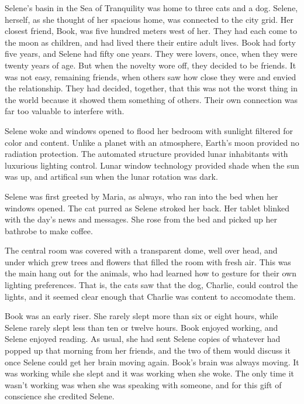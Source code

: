 

﻿Selene’s basin in the Sea of Tranquility was home to three cats and a
dog.  Selene, herself, as she thought of her spacious home, was
connected to the city grid.  Her closest friend, Book, was five
hundred meters west of her.  They had each come to the moon as
children, and had lived there their entire adult lives.  Book had
forty five years, and Selene had fifty one years.  They were lovers,
once, when they were twenty years of age.  But when the novelty wore
off, they decided to be friends.  It was not easy, remaining friends,
when others saw how close they were and envied the relationship.  They
had decided, together, that this was not the worst thing in the world
because it showed them something of others.  Their own connection was
far too valuable to interfere with.

Selene woke and windows opened to flood her bedroom with sunlight
filtered for color and content.  Unlike a planet with an atmosphere,
Earth’s moon provided no radiation protection.  The automated
structure provided lunar inhabitants with luxurious lighting control.
Lunar window technology provided shade when the sun was up, and
artifical sun when the lunar rotation was dark.

Selene was first greeted by Maria, as always, who ran into the bed
when her windows opened.  The cat purred as Selene stroked her back.
Her tablet blinked with the day’s news and messages.  She rose from
the bed and picked up her bathrobe to make coffee.

The central room was covered with a transparent dome, well over head,
and under which grew trees and flowers that filled the room with fresh
air.  This was the main hang out for the animals, who had learned how
to gesture for their own lighting preferences.  That is, the cats saw
that the dog, Charlie, could control the lights, and it seemed clear
enough that Charlie was content to accomodate them.

Book was an early riser.  She rarely slept more than six or eight
hours, while Selene rarely slept less than ten or twelve hours.  Book
enjoyed working, and Selene enjoyed reading.  As usual, she had sent
Selene copies of whatever had popped up that morning from her friends,
and the two of them would discuss it once Selene could get her brain
moving again.  Book’s brain was always moving.  It was working while
she slept and it was working when she woke.  The only time it wasn’t
working was when she was speaking with someone, and for this gift of
conscience she credited Selene.

